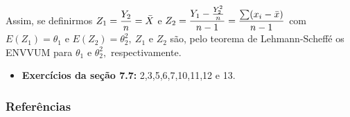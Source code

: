 \documentclass[12pt]{beamer}
\begin{document}
\begin{frame}{}
\begin{block}{}
\justifying
Assim, se definirmos $Z_{1}=\dfrac{Y_{2}}{n}=\Bar{X}$ e $Z_{2}=\dfrac{Y_{1}-\frac{Y_{2}^{2}}{n}}{n-1}=\dfrac{\sum (x_{i}-\Bar{x})}{n-1}$ com $E(Z_{1})=\theta_{1}$ e $E(Z_{2})=\theta_{2}^{2},~Z_{1}$ e $Z_{2}$ são, pelo teorema de Lehmann-Scheffé os ENVVUM para $\theta_{1}$ e $\theta_{2}^{2},$ respectivamente.
\end{block}
\end{frame}

\begin{frame}{}
\begin{block}{\Home}
\justifying
\begin{itemize}
    \item \textbf{Exercícios da seção 7.7:} 2,3,5,6,7,10,11,12 e 13.
\end{itemize}
\nocite{hogg, casella2021statistical, bolfarine}
\end{block}
\end{frame}

\begin{frame}[allowframebreaks]
\frametitle{\bf Referências}
\printbibliography
\end{frame}
\end{document}
